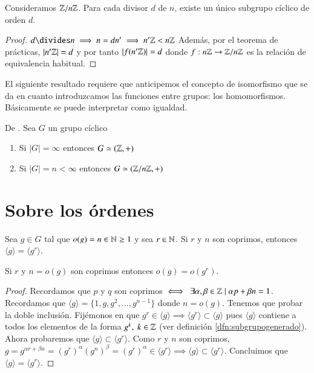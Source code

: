 \begin{pro}
	Consideramos $\mathbb{Z}/n\mathbb{Z}$. Para cada divisor $d$ de $n$, existe un único subgrupo cíclico de orden $d$.
\end{pro}

\begin{proof}
	$d \divides n \implies n = dn' \implies n'\Z < n\Z$ Además, por el teorema de prácticas, $|n'\mathbb{Z}| = d$ y por tanto $|f(n'\mathbb{Z})| = d$ donde $f:n\mathbb{Z} \to \mathbb{Z}/n\mathbb{Z}$ es la relación de equivalencia habitual.
\end{proof}

El siguiente resultado requiere que anticipemos el concepto de isomorfismo que se da en cuanto introduzcamos las funciones entre grupos: los homomorfismos. Básicamente se puede interpretar como igualdad.

\begin{thm} De \cite{dor96}.
	\label{thm:clasificacionciclicos}
	Sea $G$ un grupo cíclico
	\begin{enumerate}
		\item Si $|G| = \infty$ entonces $G \simeq (\mathbb{Z}, +)$
		\item Si $|G| = n < \infty$ entonces $G \simeq (\mathbb{Z}/n\mathbb{Z}, +)$
	\end{enumerate}
\end{thm}

\section{Sobre los órdenes}

\begin{thm}
	\label{thm:coprimosgeneradosiguales}
	Sea $g \in G$ tal que $o(g) = n \in \mathbb{N} \geq 1$ y sea $r \in \mathbb{N}$. Si $r$ y $n$ son coprimos, entonces $\langle g \rangle = \langle g^r \rangle$.
\end{thm}

\begin{cor}
	Si $r$ y $n = o(g)$ son coprimos entonces $o(g) = o(g^r)$.
\end{cor}

\begin{proof}
	Recordamos que $p$ y $q$ son coprimos $\iff\ \exists \alpha, \beta \in \mathbb{Z} \mid \alpha p + \beta n = 1$. Recordamos que $\langle g \rangle = \{1, g, g^2, \dots, g^{n-1}\}$ donde $n = o(g)$. Tenemos que probar la doble inclusión. Fijémonos en que $g^r \in \langle g \rangle \implies \langle g^r\rangle \subset \langle g \rangle$ pues $\langle g \rangle$ contiene a todos los elementos de la forma $g^k,\ k \in \mathbb{Z}$ (ver definición \ref{dfn:subgrupogenerado}). Ahora probaremos que $\langle g \rangle \subset \langle g^r \rangle$. Como $r$ y $n$ son coprimos, $g = g^{\alpha r + \beta n} = (g^r)^\alpha (g^n)^\beta = (g^r)^\alpha \in \langle g^r \rangle \implies \langle g \rangle \subset \langle g^r \rangle$. Concluimos que $\langle g \rangle = \langle g^r \rangle$.
\end{proof}

